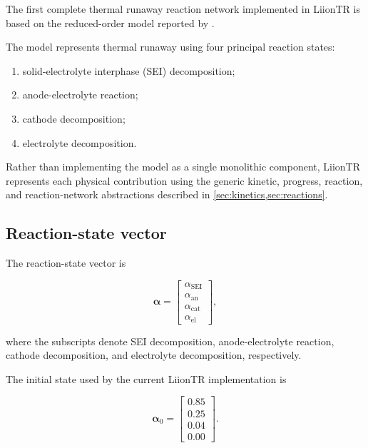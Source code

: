 The first complete thermal runaway reaction network implemented in
LiionTR is based on the reduced-order model reported by
\textcite{hu2020inhibition}.

The model represents thermal runaway using four principal reaction
states:

\begin{enumerate}
    \item solid-electrolyte interphase (SEI) decomposition;
    \item anode-electrolyte reaction;
    \item cathode decomposition;
    \item electrolyte decomposition.
\end{enumerate}

Rather than implementing the model as a single monolithic component,
LiionTR represents each physical contribution using the generic kinetic,
progress, reaction, and reaction-network abstractions described in
\cref{sec:kinetics,sec:reactions}.


\subsection{Reaction-state vector}

The reaction-state vector is

\begin{equation}
    \boldsymbol{\alpha}
    =
    \begin{bmatrix}
        \alpha_{\mathrm{SEI}} \\
        \alpha_{\mathrm{an}} \\
        \alpha_{\mathrm{cat}} \\
        \alpha_{\mathrm{el}}
    \end{bmatrix},
    \label{eq:hu_state_vector}
\end{equation}

where the subscripts denote SEI decomposition, anode-electrolyte
reaction, cathode decomposition, and electrolyte decomposition,
respectively.

The initial state used by the current LiionTR implementation is

\begin{equation}
    \boldsymbol{\alpha}_0
    =
    \begin{bmatrix}
        0.85 \\
        0.25 \\
        0.04 \\
        0.00
    \end{bmatrix}.
    \label{eq:hu_initial_state}
\end{equation}


